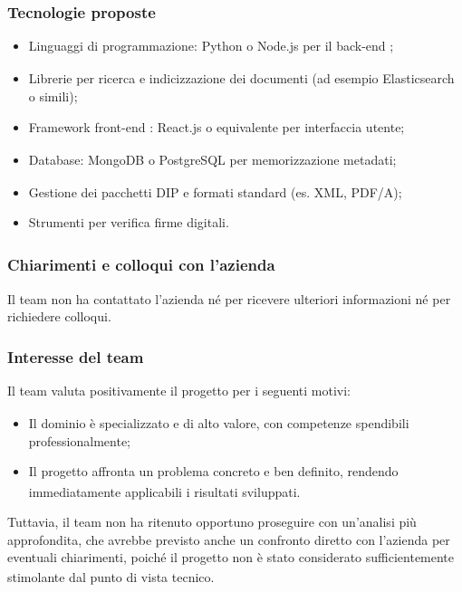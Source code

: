 \documentclass[a4paper,11pt]{article}
\begin{document}
\subsubsection{Tecnologie proposte}
\begin{itemize}[leftmargin=*]
  \item Linguaggi di programmazione: Python o Node.js per il back-end\textsubscript{}
;
  \item Librerie per ricerca e indicizzazione dei documenti (ad esempio Elasticsearch o simili);
  \item Framework front-end\textsubscript{}
: React.js o equivalente per interfaccia\textsubscript{} utente;
  \item Database: MongoDB o PostgreSQL\textsubscript{} per memorizzazione metadati;
  \item Gestione dei pacchetti DIP e formati standard (es. XML, PDF/A);
  \item Strumenti per verifica\textsubscript{} firme digitali.
\end{itemize}

\subsubsection{Chiarimenti e colloqui con l'azienda}
Il team non ha contattato l'azienda né per ricevere ulteriori informazioni né per richiedere colloqui.

\subsubsection{Interesse del team}
Il team valuta positivamente il progetto\textsubscript{}
 per i seguenti motivi:
\begin{itemize}[leftmargin=*]
  \item Il dominio è specializzato e di alto valore, con competenze spendibili professionalmente;
  \item Il progetto\textsubscript{}
 affronta un problema concreto e ben definito, rendendo immediatamente applicabili i risultati sviluppati.
\end{itemize}
Tuttavia, il team non ha ritenuto opportuno proseguire con un'analisi più approfondita, che avrebbe previsto anche 
un confronto diretto con l'azienda per eventuali chiarimenti, poiché il progetto\textsubscript{}
 non è stato considerato sufficientemente
 stimolante dal punto di vista tecnico.
\end{document}
